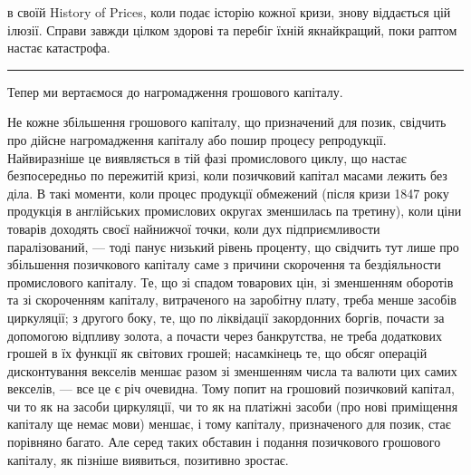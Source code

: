 \parcont{}  %
в своїй History of Prices, коли подає історію кожної кризи, знову віддається цій
ілюзії. Справи завжди цілком здорові та перебіг їхній якнайкращий, поки раптом
настає катастрофа.

\pfbreak

Тепер ми вертаємося до нагромадження грошового капіталу.

Не кожне збільшення грошового капіталу, що призначений для позик, свідчить
про дійсне нагромадження капіталу або пошир процесу репродукції. Найвиразніше
це виявляється в тій фазі промислового циклу, що настає безпосередньо по пережитій
кризі, коли позичковий капітал масами лежить без діла. В такі моменти,
коли процес продукції обмежений (після кризи 1847 року продукція в англійських
промислових округах зменшилась па третину), коли ціни товарів доходять
своєї найнижчої точки, коли дух підприємливости паралізований, — тоді панує
низький рівень проценту, що свідчить тут лише про збільшення позичкового
капіталу саме з причини скорочення та бездіяльности промислового капіталу.
Те, що зі спадом товарових цін, зі зменшенням оборотів та зі скороченням
капіталу, витраченого на заробітну плату, треба менше засобів циркуляції;
з другого боку, те, що по ліквідації закордонних боргів, почасти за допомогою
відпливу золота, а почасти через банкрутства, не треба додаткових грошей
в їх функції як світових грошей; насамкінець те, що обсяг операцій дисконтування
векселів меншає разом зі зменшенням числа та валюти цих самих
векселів, — все це є річ очевидна. Тому попит на грошовий позичковий капітал,
чи то як на засоби циркуляції, чи то як на платіжні засоби (про нові приміщення
капіталу ще немає мови) меншає, і тому капіталу, призначеного для позик,
стає порівняно багато. Але серед таких обставин і подання позичкового грошового
капіталу, як пізніше виявиться, позитивно зростає.

